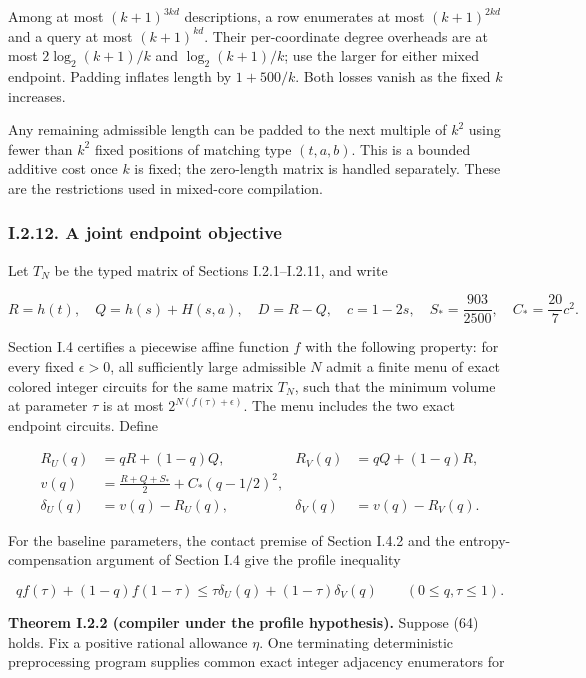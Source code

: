 Among at most \((k+1)^{3kd}\) descriptions, a row enumerates at most \((k+1)^{2kd}\) and a query at most \((k+1)^{kd}\). Their per-coordinate degree overheads are at most \(2\log_2(k+1)/k\) and \(\log_2(k+1)/k\); use the larger for either mixed endpoint. Padding inflates length by \(1+500/k\). Both losses vanish as the fixed \(k\) increases.

Any remaining admissible length can be padded to the next multiple of \(k^2\) using fewer than \(k^2\) fixed positions of matching type \((t,a,b)\). This is a bounded additive cost once \(k\) is fixed; the zero-length matrix is handled separately. These are the restrictions used in mixed-core compilation.

\hypertarget{af-a9ec399514-i.2.12.-a-joint-endpoint-objective}{%
\subsubsection{I.2.12. A joint endpoint objective}\label{af-a9ec399514-i.2.12.-a-joint-endpoint-objective}}

Let \(T_N\) be the typed matrix of Sections I.2.1--I.2.11, and write

\[
R=h(t),\quad Q=h(s)+H(s,a),\quad D=R-Q,
\quad c=1-2s,\quad S_* =\frac{903}{2500},\quad C_* =\frac{20}{7}c^2.
\]

Section I.4 certifies a piecewise affine function \(f\) with the following property: for every fixed \(\epsilon>0\), all sufficiently large admissible \(N\) admit a finite menu of exact colored integer circuits for the same matrix \(T_N\), such that the minimum volume at parameter \(\tau\) is at most \(2^{N(f(\tau)+\epsilon)}\). The menu includes the two exact endpoint circuits. Define

\[
\begin{aligned}
R_U(q)&=qR+(1-q)Q,& R_V(q)&=qQ+(1-q)R,\\
v(q)&=\frac{R+Q+S_*}{2}+C_*(q-1/2)^2,\\
\delta_U(q)&=v(q)-R_U(q),&
\delta_V(q)&=v(q)-R_V(q).
\end{aligned}
\tag{63}
\]

For the baseline parameters, the contact premise of Section I.4.2 and the entropy-compensation argument of Section I.4 give the profile inequality

\[
qf(\tau)+(1-q)f(1-\tau)
\le\tau\delta_U(q)+(1-\tau)\delta_V(q)
\qquad(0\le q,\tau\le1).
\tag{64}
\]

\textbf{Theorem I.2.2 (compiler under the profile hypothesis).} Suppose (64) holds. Fix a positive rational allowance \(\eta\). One terminating deterministic preprocessing program supplies common exact integer adjacency enumerators for

